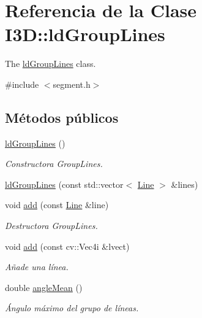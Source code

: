 \hypertarget{class_i3_d_1_1ld_group_lines}{}\section{Referencia de la Clase I3D\+:\+:ld\+Group\+Lines}
\label{class_i3_d_1_1ld_group_lines}


The \hyperlink{class_i3_d_1_1ld_group_lines}{ld\+Group\+Lines} class.  




{\ttfamily \#include $<$segment.\+h$>$}

\subsection*{Métodos públicos}
\begin{DoxyCompactItemize}
\item 
\hyperlink{class_i3_d_1_1ld_group_lines_a79a7dd784360a7b5fc298b3b3e234ff2}{ld\+Group\+Lines} ()
\begin{DoxyCompactList}\small\item\em Constructora Group\+Lines. \end{DoxyCompactList}\item 
\hyperlink{class_i3_d_1_1ld_group_lines_a23755b9c599ff37705e68847d7266b08}{ld\+Group\+Lines} (const std\+::vector$<$ \hyperlink{group___geometric_entities_ga483b43891a1b33d99406fdc397e9a445}{Line} $>$ \&lines)
\item 
void \hyperlink{class_i3_d_1_1ld_group_lines_aa64717716fa9a1cca52b984836ea0de8}{add} (const \hyperlink{group___geometric_entities_ga483b43891a1b33d99406fdc397e9a445}{Line} \&line)
\begin{DoxyCompactList}\small\item\em Destructora Group\+Lines. \end{DoxyCompactList}\item 
void \hyperlink{class_i3_d_1_1ld_group_lines_a3bd625014f024f8b1983921295c7e52f}{add} (const cv\+::\+Vec4i \&lvect)
\begin{DoxyCompactList}\small\item\em Añade una línea. \end{DoxyCompactList}\item 
double \hyperlink{class_i3_d_1_1ld_group_lines_aff601a6f106e048db7c8ed938c5451b4}{angle\+Mean} ()
\begin{DoxyCompactList}\small\item\em Ángulo máximo del grupo de líneas. \end{DoxyCompactList}\item 

\end{DoxyCompactItemize}
